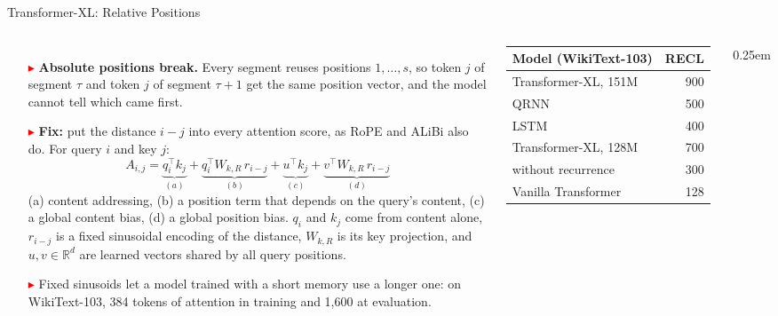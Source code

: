 \begin{frame}{Transformer-XL: Relative Positions}
  \begin{columns}[T,onlytextwidth]
      \begin{itemize}\footnotesize\itemsep0.35em
        \item[\textcolor{red}{$\blacktriangleright$}] \textbf{Absolute positions break.} Every segment reuses positions $1,\dots,s$, so token $j$ of segment $\tau$ and token $j$ of segment $\tau+1$ get the same position vector, and the model cannot tell which came first.
        \item[\textcolor{red}{$\blacktriangleright$}] \textbf{Fix:} put the distance $i-j$ into every attention score, as RoPE and ALiBi also do. For query $i$ and key $j$:
          \[ A_{i,j} = \underbrace{q_i^{\top} k_j}_{(a)} + \underbrace{q_i^{\top} W_{k,R}\, r_{i-j}}_{(b)} + \underbrace{u^{\top} k_j}_{(c)} + \underbrace{v^{\top} W_{k,R}\, r_{i-j}}_{(d)} \]
          (a) content addressing, (b) a position term that depends on the query's content, (c) a global content bias, (d) a global position bias. $q_i$ and $k_j$ come from content alone, $r_{i-j}$ is a fixed sinusoidal encoding of the distance, $W_{k,R}$ is its key projection, and $u, v \in \mathbb{R}^{d}$ are learned vectors shared by all query positions.
        \item[\textcolor{red}{$\blacktriangleright$}] Fixed sinusoids let a model trained with a short memory use a longer one: on WikiText-103, 384 tokens of attention in training and 1,600 at evaluation.
      \end{itemize}
      \centering
      {\scriptsize
      \begin{tabular}{l r}
        \toprule
        \textbf{Model (WikiText-103)} & \textbf{RECL} \\
        \midrule
        Transformer-XL, 151M & 900 \\
        QRNN & 500 \\
        LSTM & 400 \\
        \midrule
        Transformer-XL, 128M & 700 \\
        \quad without recurrence & 300 \\
        Vanilla Transformer & 128 \\
        \bottomrule
      \end{tabular}\par}
      \vspace{0.5em}
      \begin{itemize}\scriptsize\itemsep0.25em

\end{itemize}
\end{columns}
\end{frame}
